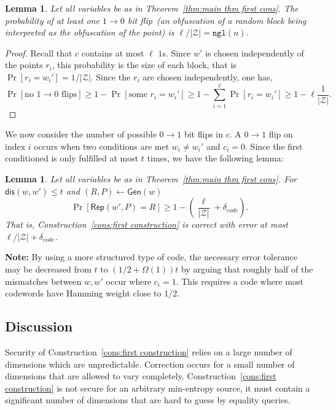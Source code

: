 \documentclass[11pt]{article}
\newcommand{\thref}[1]{\mbox{Theorem~\ref{#1}}}
\newcommand{\consref}[1]{\mbox{Construction~\ref{#1}}}
\newcommand{\class}[1]{{\ensuremath{\mathsf{#1}}}}
\newcommand{\gen}{\ensuremath{\class{Gen}}\xspace}
\newcommand{\rep}{\ensuremath{\class{Rep}}\xspace}
\newcommand{\dis}{\ensuremath{\mathsf{dis}}}
\newcommand{\ngl}{\ensuremath{\mathtt{ngl}}\xspace}
\newtheorem{lemma}[theorem]{Lemma}
\begin{document}
\begin{lemma}
\label{lem:no 1 to 0 flips}
Let all variables be as in \thref{thm:main thm first cons}.
The probability of at least one $1\rightarrow 0$ bit flip~(an obfuscation of a random block being interpreted as the obfuscation of the point) is $ \ell/|\mathcal{Z}| = \ngl(n)$.
\end{lemma}
\begin{proof}
Recall that $c$ contains at most $\ell$ $1$s.  Since $w'$ is chosen independently of the points $r_i$, this probability is the size of each block, that is $\Pr[r_i =w_i']  = 1/|\mathcal{Z}|$. Since the $r_i$ are chosen independently, one has,
\[
\Pr[\text{no $1\rightarrow 0$ flips}] \geq 1-\Pr[\text{some }r_i = w_i']\geq 1-\sum_{i=1}^\ell \Pr[r_i = w_i'] \geq 1-\ell \frac{1}{|\mathcal{Z}|}.
\]
\end{proof}

We now consider the number of possible $0\rightarrow 1$ bit flips in $c$.  A $0\rightarrow 1$ flip on index $i$ occurs when two conditions are met $w_i\neq w_i'$ and $c_i = 0$.  Since the first conditioned is only fulfilled at most $t$ times, we have the following lemma:

\begin{lemma}
\label{lem:correct of cons}
Let all variables be as in \thref{thm:main thm first cons}.
For $\dis(w, w')\leq t$ and $(R, P)\leftarrow \gen(w)$
\[
\Pr[\rep( w', P) = R] \geq 1-\left(\frac{\ell}{|\mathcal{Z}|}+\delta_{code}\right).
\]
That is, \consref{cons:first construction} is correct with error at most $\ell/|\mathcal{Z}|+\delta_{code}$.
\end{lemma}

\textbf{Note: }By using a more structured type of code, the necessary error tolerance may be decreased from $t$ to  $(1/2+\Omega(1))t$ by arguing that roughly half of the mismatches between $w, w'$ occur where $c_i =1$.  This requires a code where most codewords have Hamming weight close to $1/2$.

\subsection{Discussion}
\label{sec:discussion}
Security of \consref{cons:first construction} relies on a large number of dimensions which are unpredictable.  Correction occurs for a small number of dimensions that are allowed to vary completely.  \consref{cons:first construction} is not secure for an arbitrary min-entropy source, it must contain a significant number of dimensions that are hard to guess by equality queries.
\end{document}
